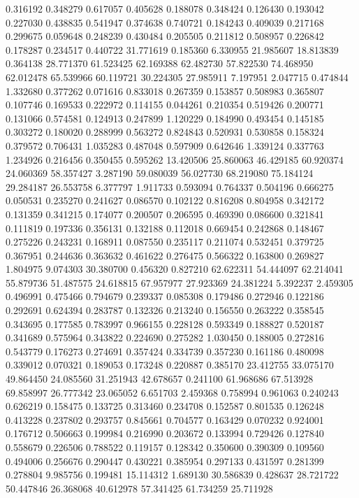 0.316192
0.348279
0.617057
0.405628
0.188078
0.348424
0.126430
0.193042
0.227030
0.438835
0.541947
0.374638
0.740721
0.184243
0.409039
0.217168
0.299675
0.059648
0.248239
0.430484
0.205505
0.211812
0.508957
0.226842
0.178287
0.234517
0.440722
31.771619
0.185360
6.330955
21.985607
18.813839
0.364138
28.771370
61.523425
62.169388
62.482730
57.822530
74.468950
62.012478
65.539966
60.119721
30.224305
27.985911
7.197951
2.047715
0.474844
1.332680
0.377262
0.071616
0.833018
0.267359
0.153857
0.508983
0.365807
0.107746
0.169533
0.222972
0.114155
0.044261
0.210354
0.519426
0.200771
0.131066
0.574581
0.124913
0.247899
1.120229
0.184990
0.493454
0.145185
0.303272
0.180020
0.288999
0.563272
0.824843
0.520931
0.530858
0.158324
0.379572
0.706431
1.035283
0.487048
0.597909
0.642646
1.339124
0.337763
1.234926
0.216456
0.350455
0.595262
13.420506
25.860063
46.429185
60.920374
24.060369
58.357427
3.287190
59.080039
56.027730
68.219080
75.184124
29.284187
26.553758
6.377797
1.911733
0.593094
0.764337
0.504196
0.666275
0.050531
0.235270
0.241627
0.086570
0.102122
0.816208
0.804958
0.342172
0.131359
0.341215
0.174077
0.200507
0.206595
0.469390
0.086600
0.321841
0.111819
0.197336
0.356131
0.132188
0.112018
0.669454
0.242868
0.148467
0.275226
0.243231
0.168911
0.087550
0.235117
0.211074
0.532451
0.379725
0.367951
0.244636
0.363632
0.461622
0.276475
0.566322
0.163800
0.269827
1.804975
9.074303
30.380700
0.456320
0.827210
62.622311
54.444097
62.214041
55.879736
51.487575
24.618815
67.957977
27.923369
24.381224
5.392237
2.459305
0.496991
0.475466
0.794679
0.239337
0.085308
0.179486
0.272946
0.122186
0.292691
0.624394
0.283787
0.132326
0.213240
0.156550
0.263222
0.358545
0.343695
0.177585
0.783997
0.966155
0.228128
0.593349
0.188827
0.520187
0.341689
0.575964
0.343822
0.224690
0.275282
1.030450
0.188005
0.272816
0.543779
0.176273
0.274691
0.357424
0.334739
0.357230
0.161186
0.480098
0.339012
0.070321
0.189053
0.173248
0.220887
0.385170
23.412755
33.075170
49.864450
24.085560
31.251943
42.678657
0.241100
61.968686
67.513928
69.858997
26.777342
23.065052
6.651703
2.459368
0.758994
0.961063
0.240243
0.626219
0.158475
0.133725
0.313460
0.234708
0.152587
0.801535
0.126248
0.413228
0.237802
0.293757
0.845661
0.704577
0.163429
0.070232
0.924001
0.176712
0.506663
0.199984
0.216990
0.203672
0.133994
0.729426
0.127840
0.558679
0.226506
0.788522
0.119157
0.128342
0.350600
0.390309
0.109560
0.494006
0.256676
0.290447
0.430221
0.385954
0.297133
0.431597
0.281399
0.278804
9.985756
0.199481
15.114312
1.689130
30.586839
0.428637
28.721722
50.447846
26.368068
40.612978
57.341425
61.734259
25.711928
